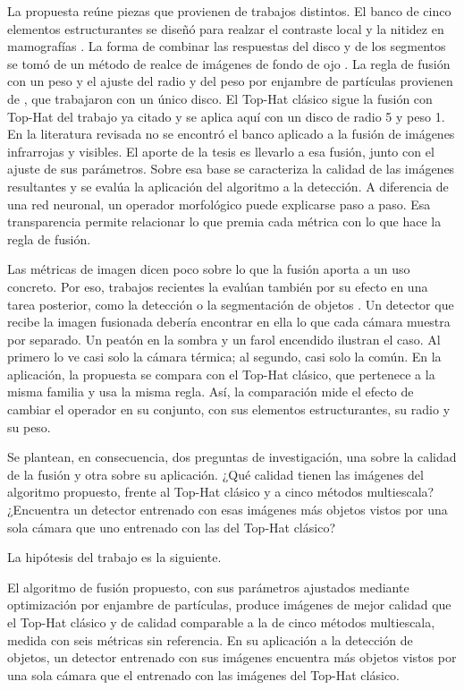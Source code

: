 La propuesta reúne piezas que provienen de trabajos distintos. El banco de cinco elementos
estructurantes se diseñó para realzar el contraste local y la nitidez en mamografías \parencite{floressf}.
La forma de combinar las respuestas del disco y de los segmentos se tomó de un método de realce de
imágenes de fondo de ojo \parencite{bala2024}. La regla de fusión con un peso y el ajuste del radio y del
peso por enjambre de partículas provienen de \textcite{ortegarodriguez2025}, que trabajaron con un único
disco. El Top-Hat clásico sigue la fusión con Top-Hat del trabajo ya citado
\parencite{bajacfigueredo2024} y se aplica aquí con un disco de radio 5 y peso 1. En la literatura
revisada no se encontró el banco aplicado a la fusión de imágenes infrarrojas y visibles. El aporte de
la tesis es llevarlo a esa fusión, junto con el ajuste de sus parámetros. Sobre esa base se
caracteriza la calidad de las imágenes resultantes y se evalúa la aplicación del algoritmo a la
detección. A diferencia
de una red neuronal, un operador morfológico puede explicarse paso a paso. Esa transparencia permite relacionar lo que premia cada métrica con lo
que hace la regla de fusión.

Las métricas de imagen dicen poco sobre lo que la fusión aporta a un uso concreto. Por eso, trabajos
recientes la evalúan también por su efecto en una tarea posterior, como la detección o la segmentación
de objetos \parencite{liu2022, tang2022}. Un detector que recibe la imagen fusionada debería encontrar
en ella lo que cada cámara muestra por separado. Un peatón en la sombra y un farol encendido ilustran el
caso. Al primero lo ve casi solo la cámara térmica; al segundo, casi solo la común. En la aplicación, la
propuesta se compara con el Top-Hat clásico, que pertenece a la misma familia y usa la misma regla.
Así, la comparación mide el efecto de cambiar el operador en su conjunto, con sus elementos
estructurantes, su radio y su peso.

Se plantean, en consecuencia, dos preguntas de investigación, una sobre la calidad de la fusión y otra
sobre su aplicación. ¿Qué calidad tienen las imágenes del algoritmo propuesto, frente al Top-Hat clásico
y a cinco métodos multiescala? ¿Encuentra un detector entrenado con esas imágenes más objetos vistos por
una sola cámara que uno entrenado con las del Top-Hat clásico?

La hipótesis del trabajo es la siguiente.

El algoritmo de fusión propuesto, con sus parámetros ajustados mediante optimización por enjambre de
partículas, produce imágenes de mejor calidad que el Top-Hat clásico y de calidad comparable a la de
cinco métodos multiescala, medida con seis métricas sin referencia. En su aplicación a la detección de
objetos, un detector entrenado con sus imágenes encuentra más objetos vistos por una sola cámara que el
entrenado con las imágenes del Top-Hat clásico.

